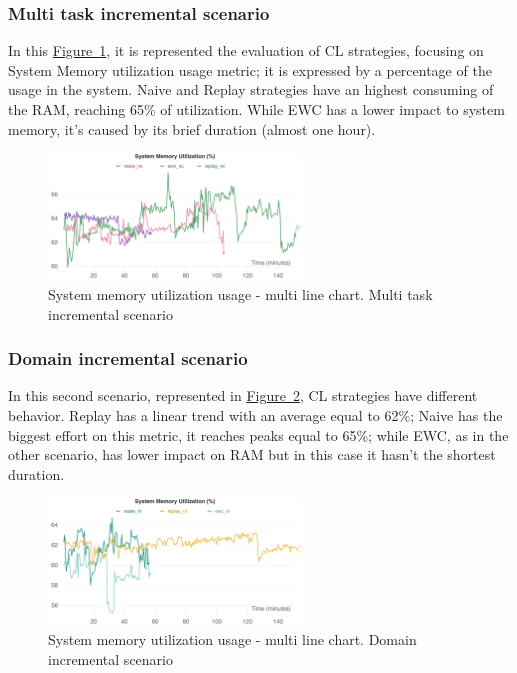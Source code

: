 \documentclass[english, LaM, oneside]{sapthesis}%
\begin{document}
\subsubsection{Multi task incremental scenario}
In this \hyperref[Fig:114]{Figure~\ref*{Fig:114}}, it is represented the evaluation of CL strategies, focusing on System Memory utilization usage metric; it is expressed by a percentage of the usage in the system. Naive and Replay strategies have an highest consuming of the RAM, reaching 65\%  of utilization. While EWC has a lower impact to system memory, it's caused by its brief duration (almost one hour).
\begin{figure}[!h]
  
     \centering
     \includegraphics[width=0.60\textwidth]{overview system memory utilization nc.png}
     \caption{System memory utilization usage - multi line chart. Multi task incremental scenario}\label{Fig:114}
   
   
\end{figure}

\vspace{10mm}
\subsubsection{Domain incremental scenario}
In this second scenario, represented in \hyperref[Fig:108]{Figure~\ref*{Fig:108}}, CL strategies have different behavior. Replay has a linear  trend with an average equal to 62\%; Naive has the biggest effort on this metric, it reaches peaks equal to 65\%; while EWC, as in the other scenario, has lower impact on RAM  but in this case it hasn't the shortest duration. 
\begin{figure}[!h]
  
     \centering
     \includegraphics[width=0.60\textwidth]{overview system memory utilization ni.png}
     \caption{System memory utilization usage - multi line chart. Domain incremental scenario}\label{Fig:108}
   
   
\end{figure}
    
\end{document}
